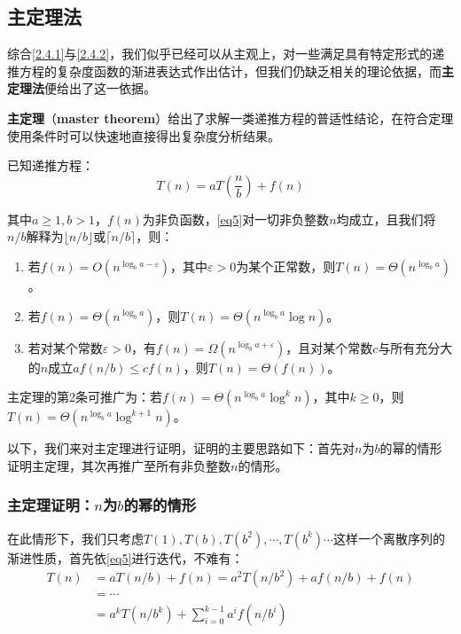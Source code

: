 \documentclass[12pt,a4paper,violet]{bbe}
\begin{document}
\subsection{主定理法\label{2.4.3}}
综合\cref{2.4.1}与\cref{2.4.2}，我们似乎已经可以从主观上，对一些满足具有特定形式的递推方程的复杂度函数的渐进表达式作出估计，但我们仍缺乏相关的理论依据，而\textbf{主定理法}便给出了这一依据。

\textbf{主定理}（\textbf{master theorem}）给出了求解一类递推方程的普适性结论，在符合定理使用条件时可以快速地直接得出复杂度分析结果。
\begin{theorem}
	已知递推方程：
	\begin{equation}
		T(n)=aT\left(\frac{n}{b}\right)+f(n)
		\label{eq5}
	\end{equation}
	
	其中$a\geqslant1,b>1$，$f(n)$为非负函数，\cref{eq5}对一切非负整数$n$均成立，且我们将$n/b$解释为$\lfloor n/b\rfloor$或$\lceil n/b\rceil$，则：
\begin{enumerate}
	\item 若$f(n)=O(n^{\log_ba-\varepsilon})$，其中$\varepsilon>0$为某个正常数，则$T(n)=\Theta(n^{\log_ba})$。
	\item 若$f(n)=\Theta(n^{\log_ba})$，则$T(n)=\Theta(n^{\log_ba}\log n)$。
	\item 若对某个常数$\varepsilon>0$，有$f(n)=\Omega(n^{\log_ba+\varepsilon})$，且对某个常数$c$与所有充分大的$n$成立$af(n/b)\leqslant cf(n)$，则$T(n)=\Theta(f(n))$。
\end{enumerate}
\end{theorem}
\begin{remark}
	主定理的第2条可推广为：若$f(n)=\Theta(n^{\log_ba}\log^k n)$，其中$k\geqslant 0$，则$T(n)=\Theta(n^{\log_ba}\log^{k+1} n)$。
\end{remark}

以下，我们来对主定理进行证明，证明的主要思路如下：首先对$n$为$b$的幂的情形证明主定理，其次再推广至所有非负整数$n$的情形。
\subsubsection{主定理证明：$n$为$b$的幂的情形}

在此情形下，我们只考虑$T(1),T(b),T(b^2),\cdots,T(b^k)\cdots$这样一个离散序列的渐进性质，首先依\cref{eq5}进行迭代，不难有：
$$
\begin{array}{rl}
	T(n)&=aT(n/b)+f(n)=a^2T(n/b^2)+af(n/b)+f(n)\\
	&=\cdots\\
	&=a^kT(n/b^k)+\sum\limits_{i=0}^{k-1}a^if(n/b^i)
\end{array}
$$
\end{document}
